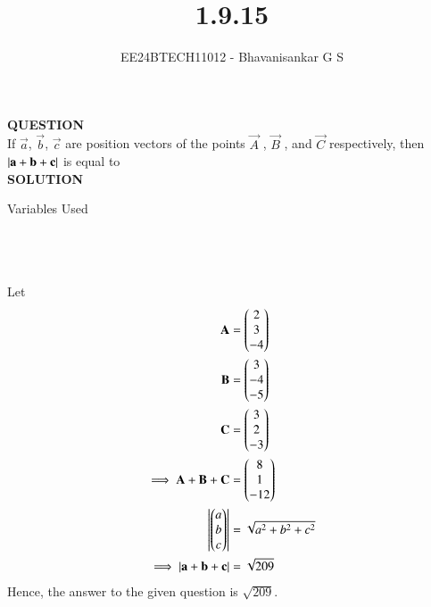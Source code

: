\documentclass[journal]{IEEEtran}
\begin{document}

\vspace{3cm}

\title{1.9.15}
\author{EE24BTECH11012 - Bhavanisankar G S}
{\let\newpage\relax\maketitle}

\renewcommand{\thefigure}{\theenumi}
\renewcommand{\thetable}{\theenumi}
\setlength{\intextsep}{10pt} %


\renewcommand{\thetable}{\theenumi}

\textbf{QUESTION} \\
If $\vec{a}$, $\vec{b}$, $\vec{c}$ are position vectors of the points $\vec{A}$ , $\vec{B}$ , and $\vec{C}$  respectively, then $\left\vert\mathbf{a}+\mathbf{b}+\mathbf{c}\right\vert$ is equal to \\
\textbf{SOLUTION} \\
\begin{table}[h!]
	\centering
        
	\caption{Variables Used}
	\label{tab10.5.3.9.1}
\end{table} \\ \\ \\
Let 
\begin{align}
	\mathbf{A} &= \begin{pmatrix} 2\\3\\-4\end{pmatrix} \\ \mathbf{B} &= \begin{pmatrix}3\\-4\\-5\end{pmatrix} \\\mathbf{C} &= \begin{pmatrix}3\\2\\-3\end{pmatrix}  \\
	\implies	 \mathbf{A}+\mathbf{B}+\mathbf{C} &= \begin{pmatrix}8\\1\\-12\end{pmatrix}  \\
	\left\vert\begin{pmatrix}a\\b\\c\end{pmatrix}\right\vert &= \sqrt{a^2 + b^2 + c^2} \\
	\implies	\left\vert\mathbf{a}+\mathbf{b}+\mathbf{c}\right\vert &= \sqrt{209}  \\
\end{align}
Hence, the answer to the given question is $\sqrt{209}$.
\end{document}
